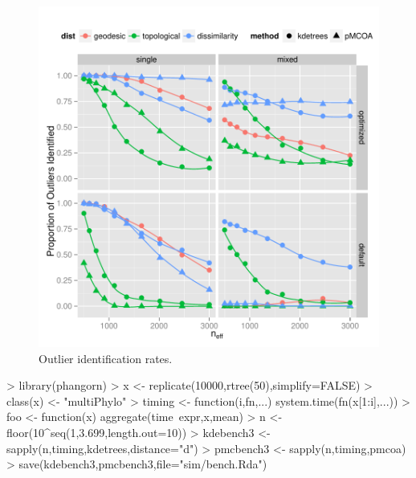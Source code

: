 \documentclass{article}
\begin{document}
\begin{figure}
  \centering
  \includegraphics{img/tpr}
  \caption{Outlier identification rates.}
  \label{fig:tprplot}
\end{figure}


\begin{Schunk}
\begin{Sinput}
> library(phangorn)
> x <- replicate(10000,rtree(50),simplify=FALSE)
> class(x) <- "multiPhylo"
> timing <- function(i,fn,...) system.time(fn(x[1:i],...))
> foo <- function(x) aggregate(time~expr,x,mean)
> n <- floor(10^seq(1,3.699,length.out=10))
> kdebench3 <- sapply(n,timing,kdetrees,distance="d")
> pmcbench3 <- sapply(n,timing,pmcoa)
> save(kdebench3,pmcbench3,file="sim/bench.Rda")
\end{Sinput}
\end{Schunk}

\begin{Schunk}
\end{Schunk}
\end{document}

